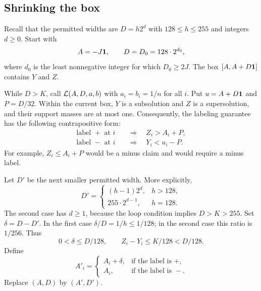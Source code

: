 \subsection{Shrinking the box}

Recall that the permitted widths are $D=h2^d$ with
$128\le h\le255$ and integers $d\ge0$. Start with
\begin{equation}
 A=-J\mathbf 1,\qquad D=D_0=128\cdot2^{d_0},
 \label{eq:initial-box}
\end{equation}
where $d_0$ is the least nonnegative integer for which $D_0\ge2J$.
The box $[A,A+D\mathbf 1]$ contains $Y$ and $Z$.

While $D>K$, call $\mathcal L(A,D,a,b)$ with
$a_i=b_i=1/n$ for all $i$. Put $u=A+D\mathbf 1$ and $P=D/32$.
Within the current box, $Y$ is a subsolution and $Z$ is a
supersolution, and their support masses are at most one. Consequently,
the labeling guarantee has the following contrapositive form:
\begin{equation}
 \begin{aligned}
 \text{label }+\text{ at }i&\quad\Longrightarrow\quad Z_i>A_i+P,\\
 \text{label }-\text{ at }i&\quad\Longrightarrow\quad Y_i<u_i-P.
 \end{aligned}
 \label{eq:label-exclusions}
\end{equation}
For example, $Z_i\le A_i+P$ would be a minus claim and would require
a minus label.

Let $D'$ be the next smaller permitted width. More explicitly,
\begin{equation}
 D'=\begin{cases}
 (h-1)2^d,&h>128,\\
 255\cdot2^{d-1},&h=128.
 \end{cases}
 \label{eq:next-width}
\end{equation}
The second case has $d\ge1$, because the loop condition implies
$D>K>255$. Set $\delta=D-D'$. In the first case
$\delta/D=1/h\le1/128$; in the second case this ratio is $1/256$.
Thus
\begin{equation}
 0<\delta\le D/128,
 \qquad Z_i-Y_i\le K/128<D/128.
 \label{eq:shrink-slack}
\end{equation}
Define
\[
 A'_i=\begin{cases}
 A_i+\delta,&\text{if the label is }+,\\
 A_i,&\text{if the label is }-.
 \end{cases}
\]
Replace $(A,D)$ by $(A',D')$.

